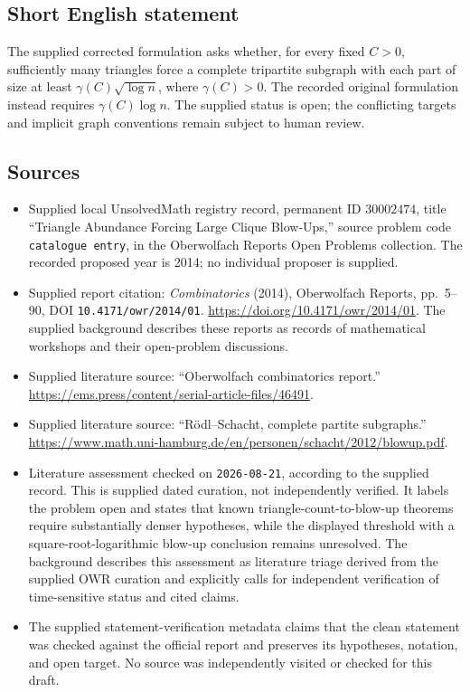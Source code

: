 \documentclass[11pt]{article}
\begin{document}
\subsection{Short English statement}
The supplied corrected formulation asks whether, for every fixed \(C>0\), sufficiently many triangles force a complete tripartite subgraph with each part of size at least \(\gamma(C)\sqrt{\log n}\), where \(\gamma(C)>0\). The recorded original formulation instead requires \(\gamma(C)\log n\). The supplied status is open; the conflicting targets and implicit graph conventions remain subject to human review.
\subsection{Sources}
\begin{itemize}
\item Supplied local UnsolvedMath registry record, permanent ID \(30002474\), title ``Triangle Abundance Forcing Large Clique Blow-Ups,'' source problem code \texttt{catalogue entry}, in the Oberwolfach Reports Open Problems collection. The recorded proposed year is 2014; no individual proposer is supplied.
\item Supplied report citation: \emph{Combinatorics} (2014), Oberwolfach Reports, pp.\ 5--90, DOI \texttt{10.4171/owr/2014/01}. \url{https://doi.org/10.4171/owr/2014/01}. The supplied background describes these reports as records of mathematical workshops and their open-problem discussions.
\item Supplied literature source: ``Oberwolfach combinatorics report.'' \url{https://ems.press/content/serial-article-files/46491}.
\item Supplied literature source: ``R\"odl--Schacht, complete partite subgraphs.'' \url{https://www.math.uni-hamburg.de/en/personen/schacht/2012/blowup.pdf}.
\item Literature assessment checked on \texttt{2026-08-21}, according to the supplied record. This is supplied dated curation, not independently verified. It labels the problem open and states that known triangle-count-to-blow-up theorems require substantially denser hypotheses, while the displayed threshold with a square-root-logarithmic blow-up conclusion remains unresolved. The background describes this assessment as literature triage derived from the supplied OWR curation and explicitly calls for independent verification of time-sensitive status and cited claims.
\item The supplied statement-verification metadata claims that the clean statement was checked against the official report and preserves its hypotheses, notation, and open target. No source was independently visited or checked for this draft.
\end{itemize}
\end{document}
